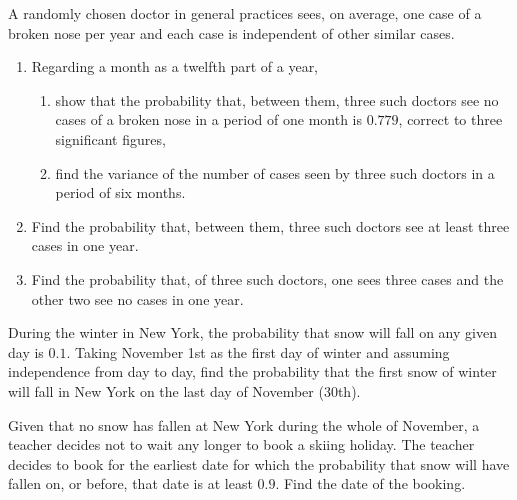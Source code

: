 \begin{problem}
    A randomly chosen doctor in general practices sees, on average, one case of a broken nose per year and each case is independent of other similar cases.

    \begin{enumerate}
        \item Regarding a month as a twelfth part of a year,
        \begin{enumerate}
            \item show that the probability that, between them, three such doctors see no cases of a broken nose in a period of one month is $0.779$, correct to three significant figures,
            \item find the variance of the number of cases seen by three such doctors in a period of six months.
        \end{enumerate}
        \item Find the probability that, between them, three such doctors see at least three cases in one year.
        \item Find the probability that, of three such doctors, one sees three cases and the other two see no cases in one year.
    \end{enumerate}
\end{problem}

\begin{problem}
    During the winter in New York, the probability that snow will fall on any given day is $0.1$. Taking November 1st as the first day of winter and assuming independence from day to day, find the probability that the first snow of winter will fall in New York on the last day of November (30th).

    Given that no snow has fallen at New York during the whole of November, a teacher decides not to wait any longer to book a skiing holiday. The teacher decides to book for the earliest date for which the probability that snow will have fallen on, or before, that date is at least $0.9$. Find the date of the booking.
\end{problem}

